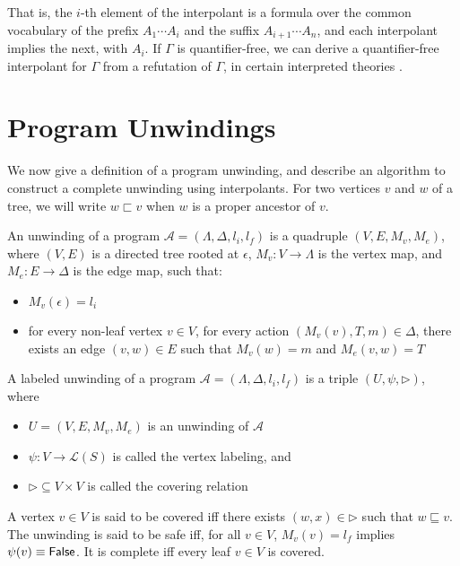 That is, the $i$-th element of the interpolant is a formula over the common vocabulary of the prefix $A_1 \cdots A_i$ and the suffix $A_{i+1} \cdots A_n$, and each interpolant implies the next, with $A_i$. If $\Gamma$ is quantifier-free, we can derive a quantifier-free interpolant for $\Gamma$ from a refutation of $\Gamma$, in certain interpreted theories \cite{mcmillan05}.

\section{Program Unwindings}

We now give a definition of a program unwinding, and describe an algorithm to construct a complete unwinding using interpolants. For two vertices $v$ and $w$ of a tree, we will write $w \sqsubset v$ when $w$ is a proper ancestor of $v$.

\begin{defn}
  \label{defn:prog-unwinding}
  An unwinding of a program $\mathcal{A} = (\Lambda, \Delta, l_i, l_f)$ is a quadruple $(V, E, M_v, M_e)$, where $(V, E)$ is a directed tree rooted at $\epsilon$, $M_v : V \rightarrow \Lambda$ is the vertex map, and $M_e : E \rightarrow \Delta$ is the edge map, such that:

  \begin{itemize}
    \item $M_v(\epsilon) = l_i$
    \item for every non-leaf vertex $v \in V$, for every action $(M_v(v), T, m) \in \Delta$, there exists an edge $(v,w) \in E$ such that $M_v(w) = m$ and $M_e(v,w) = T$
  \end{itemize}
\end{defn}

\begin{defn}
  \label{defn:labeled-prog-unwinding}
  A labeled unwinding of a program $\mathcal{A} = (\Lambda, \Delta, l_i, l_f)$ is a triple $(U, \psi, \rhd)$, where

  \begin{itemize}
    \item $U = (V, E, M_v, M_e)$ is an unwinding of $\mathcal{A}$
    \item $\psi : V \rightarrow \mathcal{L}(S)$ is called the vertex labeling, and
    \item $\rhd \subseteq V \times V$ is called the covering relation
  \end{itemize}

  A vertex $v \in V$ is said to be covered iff there exists $(w,x) \in \rhd$ such that $w \sqsubseteq v$. The unwinding is said to be safe iff, for all $v \in V$, $M_v(v) = l_f$ implies $\psi(v) \equiv \mathsf{False}$. It is complete iff every leaf $v \in V$ is covered.
\end{defn}

